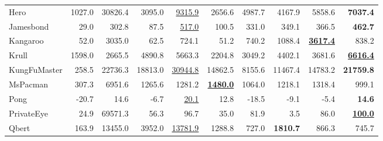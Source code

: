 \begin{table}[t]
\begin{center}
\begin{small}
{\begin{tabular}{lrr rr rrrrr}
Hero                 &  1027.0    &  30826.4   &  3095.0    &  \underline{9315.9}    &  2656.6                        &  4987.7                        &  4167.9                       &  5858.6                        &  \textbf{7037.4}               \\
Jamesbond            &  29.0      &  302.8     &  87.5      &  \underline{517.0}     &  100.5                         &  331.0                         &  349.1                        &  366.5                         &  \textbf{462.7}                \\
Kangaroo             &  52.0      &  3035.0    &  62.5      &  724.1                 &  51.2                          &  740.2                         &  1088.4                       &  \underline{\textbf{3617.4}}   &  838.2                         \\
Krull                &  1598.0    &  2665.5    &  4890.8    &  5663.3                &  2204.8                        &  3049.2                        &  4402.1                       &  3681.6                        &  \underline{\textbf{6616.4}}   \\
KungFuMaster         &  258.5     &  22736.3   &  18813.0   &  \underline{30944.8}   &  14862.5                       &  8155.6                        &  11467.4                      &  14783.2                       &  \textbf{21759.8}              \\
MsPacman             &  307.3     &  6951.6    &  1265.6    &  1281.2                &  \underline{\textbf{1480.0}}   &  1064.0                        &  1218.1                       &  1318.4                        &  999.1                         \\
Pong                 &  -20.7     &  14.6      &  -6.7      &  \underline{20.1}      &  12.8                          &  -18.5                         &  -9.1                         &  -5.4                          &  \textbf{14.6}                 \\
PrivateEye           &  24.9      &  69571.3   &  56.3      &  96.7                  &  35.0                          &  81.9                          &  3.5                          &  86.0                          &  \underline{\textbf{100.0}}    \\
Qbert                &  163.9     &  13455.0   &  3952.0    &  \underline{13781.9}   &  1288.8                        &  727.0                         &  \textbf{1810.7}              &  866.3                         &  745.7                         \\

\end{tabular}}
\end{small}
\end{center}
\end{table}
